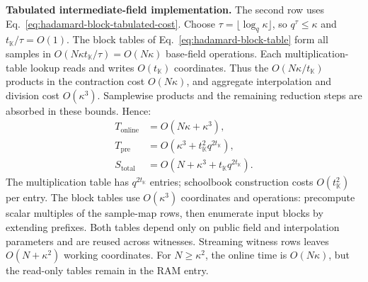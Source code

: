 \smallskip\noindent\textbf{Tabulated intermediate-field implementation.}
The second \methodname{} row uses
Eq.~\eqref{eq:hadamard-block-tabulated-cost}.
Choose \(\tau=\lfloor\log_q\kappa\rfloor\), so
\(q^\tau\leq\kappa\) and \(t_{\mathbb K}/\tau=O(1)\).
The block tables of Eq.~\eqref{eq:hadamard-block-table}
form all samples in \(O(N\kappa t_{\mathbb K}/\tau)
=O(N\kappa)\) base-field operations.
Each multiplication-table lookup reads and writes
\(O(t_{\mathbb K})\) coordinates. Thus the
\(O(N\kappa/t_{\mathbb K})\) products in the contraction
cost \(O(N\kappa)\), and aggregate interpolation and division
cost \(O(\kappa^3)\). Samplewise products and the remaining
reduction steps are absorbed in these bounds. Hence:
\begin{equation}
\begin{aligned}
T_{\mathrm{online}}&=O(N\kappa+\kappa^3),\\
T_{\mathrm{pre}}&=O(\kappa^3+t_{\mathbb K}^2q^{2t_{\mathbb K}}),\\
S_{\mathrm{total}}&=O(N+\kappa^3+t_{\mathbb K}q^{2t_{\mathbb K}}).
\end{aligned}
\label{eq:hadamard-tabulation-full-cost}
\end{equation}
The multiplication table has \(q^{2t_{\mathbb K}}\) entries;
schoolbook construction costs \(O(t_{\mathbb K}^2)\) per entry.
The block tables use \(O(\kappa^3)\) coordinates and operations:
precompute scalar multiples of the sample-map rows, then enumerate
input blocks by extending prefixes. Both tables depend only on
public field and interpolation parameters and are reused across
witnesses. Streaming witness rows leaves \(O(N+\kappa^2)\)
working coordinates. For \(N\geq\kappa^2\), the online time is
\(O(N\kappa)\), but the read-only tables remain in the RAM entry.
